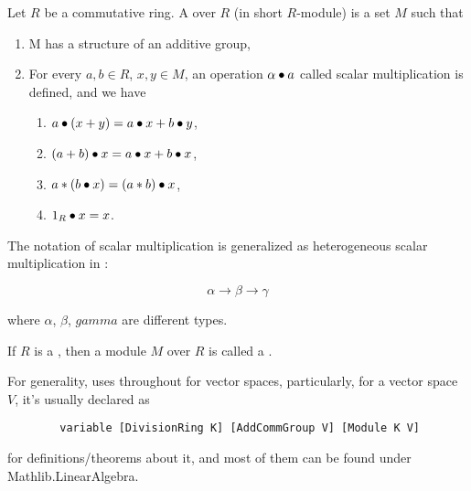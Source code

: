 
\begin{definition}[Module]
    \label{Module}
    \leanok

    Let $R$ be a commutative ring. A  over $R$ (in short $R$-module) is a set $M$ such that

    \begin{enumerate}
      \item M has a structure of an additive group,
    
      \item For every $a, b \in R$, $x, y \in M$, an operation $\alpha \bullet a$ called scalar multiplication is defined, and we have
      
        \begin{enumerate}[i]
            \item $a \bullet (x + y) = a \bullet x + b \bullet y$,
            \item $(a + b) \bullet x = a \bullet x + b \bullet x$,
            \item $a * (b \bullet x)=(a * b) \bullet x$,
            \item $1_R \bullet x = x$.
        \end{enumerate}
    \end{enumerate}

\end{definition}

\begin{remark}
    \label{mk:Module}

    The notation of scalar multiplication is generalized as heterogeneous scalar multiplication in \Mathlib:

    $$
    \alpha \to \beta \to \gamma
    $$

    where $\alpha$, $\beta$, $gamma$ are different types.
    
\end{remark}

\begin{definition}
    \label{VectorSpace}
    \leanok

    If $R$ is a , then a module $M$ over $R$ is called a .

\end{definition}

\begin{remark}
    \label{mk:VectorSpace}

    For generality, \Mathlib uses  throughout for vector spaces,
    particularly, for a vector space $V$, it's usually declared as

    \begin{lstlisting}
        variable [DivisionRing K] [AddCommGroup V] [Module K V]
    \end{lstlisting}

    for definitions/theorems about it, and most of them can be found under \textsf{Mathlib.LinearAlgebra}. %
    
\end{remark}

